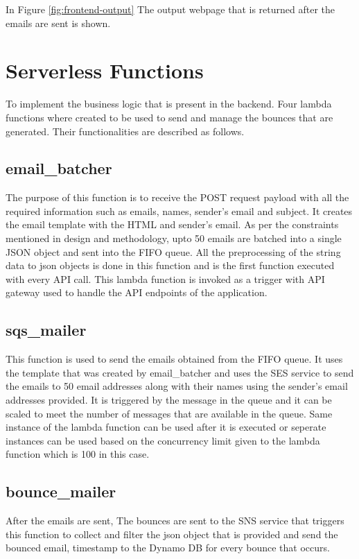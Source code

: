 In Figure \ref{fig:frontend-output} The output webpage that is returned after the emails are sent is shown.  

\section{Serverless Functions}
To implement the business logic that is present in the backend. Four lambda functions where created to be used to send and manage the bounces that are generated. Their functionalities are described as follows.

\subsection{email\_batcher}

The purpose of this function is to receive the POST request payload with all the required information such as emails, names, sender's email and subject. It creates the email template with the HTML and sender's email. As per the constraints mentioned in design and methodology, upto 50 emails are batched into a single JSON object and sent into the FIFO queue. All the preprocessing of the string data to json objects is done in this function and is the first function executed with every API call. This lambda function is invoked as a trigger with API gateway used to handle the API endpoints of the application. 


\subsection{sqs\_mailer}

This function is used to send the emails obtained from the FIFO queue. It uses the template that was created by email\_batcher and uses the SES service to send the emails to 50 email addresses along with their names using the sender's email addresses provided. It is triggered by the message in the queue and it can be scaled to meet the number of messages that are available in the queue. Same instance of the lambda function can be used after it is executed or seperate instances can be used based on the concurrency limit given to the lambda function which is 100 in this case.

\subsection{bounce\_mailer}

After the emails are sent, The bounces are sent to the SNS service that triggers this function to collect and filter the json object that is provided and send the bounced email, timestamp to the Dynamo DB for every bounce that occurs. 
 

